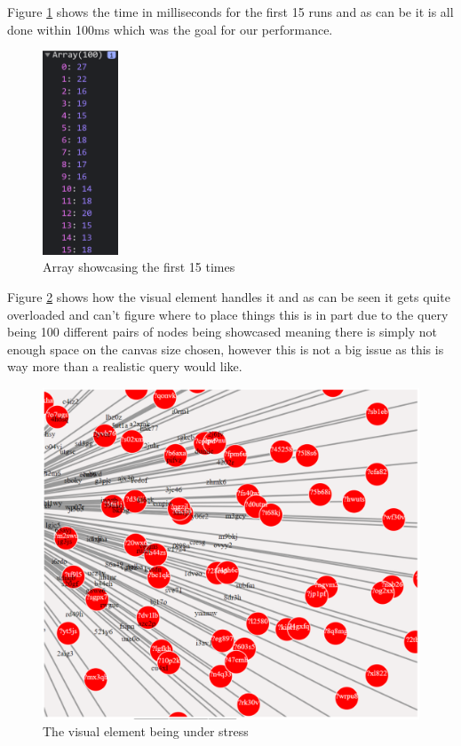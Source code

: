 Figure \ref{fig:array-15} shows the time in milliseconds for the first 15 runs and as can be it is all done within 100ms which was the goal for our performance. 
\begin{figure}[H]
    \centering
    \includegraphics[width=0.2\textwidth]{figures/array-15.pdf}
    \caption{Array showcasing the first 15 times}
    \label{fig:array-15}
\end{figure}
Figure \ref{fig:bad-visual} shows how the visual element handles it and as can be seen it gets quite overloaded and can’t figure where to place things this is in part due to the query being 100 different pairs of nodes being showcased meaning there is simply not enough space on the canvas size chosen, however this is not a big issue as this is way more than a realistic query would like.
\begin{figure}[H]
    \centering
    \includegraphics[width=1\textwidth]{figures/bad-visual.pdf}
    \caption{The visual element being under stress}
    \label{fig:bad-visual}
\end{figure}



